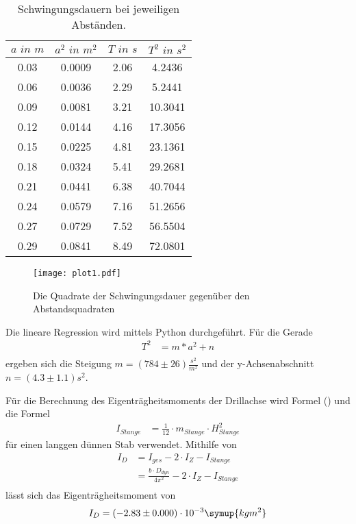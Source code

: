 \begin{table}
  \centering
  \caption{Schwingungsdauern bei jeweiligen Abständen.}
  \label{tab:data2}
  \begin{tabular}{c c c c }
    \toprule $a \, \,  in \,\, m$ & $a^2 \,\, in \,\,  m^2$ & $T \,\, in \,\, s$ & $T^2 \,\, in  \,\, s^2$ \\
    \midrule
    0.03 & 0.0009 & 2.06 &  4.2436\\
    0.06 & 0.0036 & 2.29 &  5.2441\\
    0.09 & 0.0081 & 3.21 &  10.3041\\
    0.12 & 0.0144 & 4.16 &  17.3056\\
    0.15 & 0.0225 & 4.81 &  23.1361\\
    0.18 & 0.0324 & 5.41 &  29.2681\\
    0.21 & 0.0441 & 6.38 &  40.7044\\
    0.24 & 0.0579 & 7.16 &  51.2656\\
    0.27 & 0.0729 & 7.52 &  56.5504\\
    0.29 & 0.0841 & 8.49 &  72.0801\\
    \bottomrule
  \end{tabular}
\end{table}

\begin{figure}
  \texttt{[image: plot1.pdf]}
  \caption{Die Quadrate der Schwingungsdauer gegenüber den Abstandsquadraten}
\end{figure}

Die lineare Regression wird mittels Python durchgeführt. Für die Gerade
\begin{align}
  T^2 &= m * a^2 + n\\
\end{align}
ergeben sich die Steigung $m = (784 \pm 26) \frac{s^2}{m^2}$ und der y-Achsenabschnitt $n = (4.3 \pm 1.1) s^2$.

Für die Berechnung des Eigenträgheitsmoments der Drillachse wird Formel () und die Formel
\begin{align}
I_{Stange} &= \frac{1}{12} \cdot m_{Stange} \cdot H_{Stange}^2
\end{align}
für einen langgen dünnen Stab verwendet. Mithilfe von
\begin{align}
  I_D        &= I_{ges} - 2 \cdot I_{Z} - I_{Stange}\\
             &= \frac{b \cdot D_{dyn}}{4 \pi^2} - 2 \cdot I_{Z} - I_{Stange}\\
\end{align}
lässt sich das Eigenträgheitsmoment von
\begin{equation}
  I_D = (-2.83 \pm 0.000)\cdot10^{-3} \symup{kg m^2}
\end{equation}

